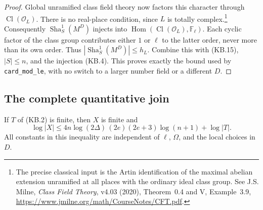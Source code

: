 \begin{proof}
Global unramified class field theory now factors this character
through $\operatorname{Cl}(\mathcal O_L)$.  There is no real-place
condition, since $L$ is totally complex.\footnote{The precise
classical input is the Artin identification of the maximal abelian
extension unramified at all places with the ordinary ideal class
group.  See J.S. Milne, \emph{Class Field Theory}, v4.03 (2020),
Theorem~0.4 and V, Example~3.9,
\url{https://www.jmilne.org/math/CourseNotes/CFT.pdf}.}
Consequently
$\operatorname{Sha}^1_S(M^D)$ injects into
$\operatorname{Hom}(\operatorname{Cl}(\mathcal O_L),\mathbb F_\ell)$.
Each cyclic factor of the class group contributes either $1$ or
$\ell$ to the latter order, never more than its own order.
Thus $|\operatorname{Sha}^1_S(M^D)|\le h_L$.
Combine this with (KB.15), $|S|\le n$, and the injection (KB.4).
This proves exactly the bound used by \texttt{card\_mod\_le},
with no switch to a larger number field or a different $D$.
\end{proof}

\subsection{The complete quantitative join}

\begin{proposition}
\label{claim:KB7}
If $T$ of (KB.2) is finite, then $X$ is finite and
\[
 \log |X|\le
 4n\log(2\Delta)\,(2e)(2e+3)\log(n+1)+\log|T|.
 \tag{KB.16}
\]
All constants in this inequality are independent of
$\ell$, $\Omega$, and the local choices in $D$.
\end{proposition}

